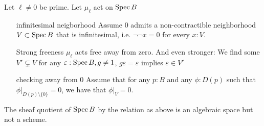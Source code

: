 \begin{prop}
	Let $\ell \neq 0$ be prime. Let $\mu_\ell$ act on $\operatorname{Spec} B$ 
	\begin{enumerate}
		\item[infinitesimal neigborhood]
		Assume 0 admits a non-contractible neighborhood  $V \subset \operatorname{Spec} B$ that is infinitesimal, i.e.  $\lnot \lnot x =0$ for every $x : V$.  \\
		\item[Strong freeness] $\mu_\ell$ acts free away from zero. And even stronger: We find some $V' \subsetneq V$ for any $\varepsilon : \operatorname{Spec} B, g\neq 1$, $g \varepsilon = \varepsilon$ implies $\varepsilon \in V'$

	\item[checking away from 0] Assume that for any $p : B$ and any $\phi: D(p)$ such that $\phi|_{D(p) \setminus\{0\}} = 0$, we have that $\phi|_V = 0$.
		\end{enumerate} 
	The sheaf quotient of $\operatorname{Spec} B$ by the relation as above is an algebraic space but not a scheme.
\end{prop}
